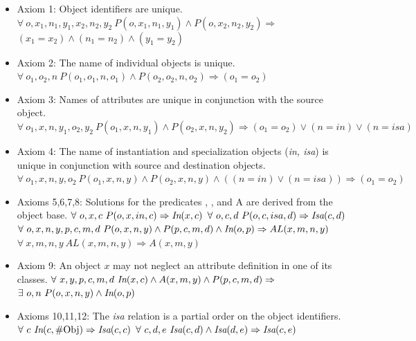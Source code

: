 \begin{itemize}
\item Axiom 1: Object identifiers are unique.\newline
$\forall ~o,x_1,n_1,y_1,x_2,n_2,y_2 ~P(o,x_1,n_1,y_1) \land
         P(o,x_2,n_2,y_2) \Rightarrow$\newline
$(x_1=x_2) \land (n_1=n_2) \land (y_1=y_2)$
\item Axiom 2: The name of individual objects is unique.\newline
$\forall ~o_1,o_2,n ~P(o_1,o_1,n,o_1) \land P(o_2,o_2,n,o_2) \Rightarrow
                     (o_1=o_2)$
\item Axiom 3: Names of attributes are unique in 
conjunction with the source object.\newline
$\forall ~o_1,x,n,y_1,o_2,y_2 ~P(o_1,x,n,y_1) \land
    P(o_2,x,n,y_2) \Rightarrow
(o_1=o_2) \lor (n=in) \lor (n=isa)$
\item Axiom 4: The name of instantiation and specialization objects
({\it in, isa\/}) is unique in conjunction with source and destination
objects.\newline
$\forall ~o_1,x,n,y,o_2 ~P(o_1,x,n,y) \land
              P(o_2,x,n,y) \land
((n = in) \lor (n = isa)) \Rightarrow (o_1=o_2)$
\item Axioms 5,6,7,8: Solutions for the predicates \In, \Isa,
and A are derived from the object base.\newline
$\forall ~o,x,c ~P(o,x,in,c) \Rightarrow \hbox{\it In}(x,c) $\newline
$\forall ~o,c,d ~P(o,c,isa,d) \Rightarrow \hbox{\it Isa}(c,d)$\newline
$\forall ~o,x,n,y,p,c,m,d ~P(o,x,n,y) \land P(p,c,m,d) \land \hbox{\it In}(o,p)
        \Rightarrow AL(x,m,n,y)$\newline
$\forall ~x,m,n,y ~AL(x,m,n,y) \Rightarrow A(x,m,y)$
\item Axiom 9: An object $x$ may not neglect an attribute definition
in one of its classes.\newline
$\forall ~x,y,p,c,m,d ~\hbox{\it In}(x,c) \land A(x,m,y) \land
         P(p,c,m,d) \Rightarrow$\newline
$\exists ~o,n ~P(o,x,n,y) \land \hbox{\it In}(o,p)$
\item Axioms 10,11,12: The {\it isa\/} relation is a partial order
on the object identifiers.\newline
$\forall ~c ~\hbox{\it In}(c,\hbox{\#Obj}) \Rightarrow \hbox{\it Isa}(c,c)$\newline
$\forall ~c,d,e ~\hbox{\it Isa}(c,d) \land \hbox{\it Isa}(d,e) \Rightarrow
        \hbox{\it Isa}(c,e)$\newline

\end{itemize}
